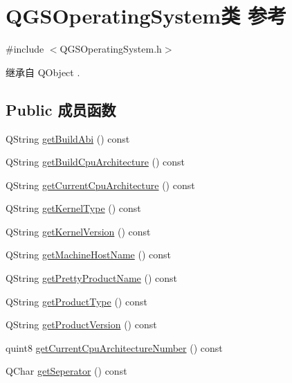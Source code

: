 \hypertarget{class_q_g_s_operating_system}{}\section{Q\+G\+S\+Operating\+System类 参考}
\label{class_q_g_s_operating_system}


{\ttfamily \#include $<$Q\+G\+S\+Operating\+System.\+h$>$}



继承自 Q\+Object .

\subsection*{Public 成员函数}
\begin{DoxyCompactItemize}
\item 
Q\+String \mbox{\hyperlink{class_q_g_s_operating_system_aae92fcfc42f969b887917692846672fe}{get\+Build\+Abi}} () const
\item 
Q\+String \mbox{\hyperlink{class_q_g_s_operating_system_adc152c221792b48efc3cedd295188789}{get\+Build\+Cpu\+Architecture}} () const
\item 
Q\+String \mbox{\hyperlink{class_q_g_s_operating_system_ad5521a28922c439019cb47b014ee39e6}{get\+Current\+Cpu\+Architecture}} () const
\item 
Q\+String \mbox{\hyperlink{class_q_g_s_operating_system_acc01532c1aea7ddd47ef162b537b1fbe}{get\+Kernel\+Type}} () const
\item 
Q\+String \mbox{\hyperlink{class_q_g_s_operating_system_a369b6485c8b657a0f4748b7f7c4f2f32}{get\+Kernel\+Version}} () const
\item 
Q\+String \mbox{\hyperlink{class_q_g_s_operating_system_a7f34b3f1ed9e01067e1b95a4128ae124}{get\+Machine\+Host\+Name}} () const
\item 
Q\+String \mbox{\hyperlink{class_q_g_s_operating_system_a31e9a2eb37186980b2c7e17691bf53a3}{get\+Pretty\+Product\+Name}} () const
\item 
Q\+String \mbox{\hyperlink{class_q_g_s_operating_system_a940c00fe992a1d03e43e7632bf6bcf11}{get\+Product\+Type}} () const
\item 
Q\+String \mbox{\hyperlink{class_q_g_s_operating_system_a483c686a09b5f8b820d00c165096dc43}{get\+Product\+Version}} () const
\item 
quint8 \mbox{\hyperlink{class_q_g_s_operating_system_adbee457a71af057d565a2044f614855c}{get\+Current\+Cpu\+Architecture\+Number}} () const
\item 
Q\+Char \mbox{\hyperlink{class_q_g_s_operating_system_a699ced5313a073cda26a47b88becc2c0}{get\+Seperator}} () const
\end{DoxyCompactItemize}
